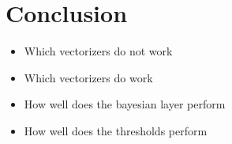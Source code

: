 \section{Conclusion}
\begin{itemize}
\item Which vectorizers do not work
\item Which vectorizers do work
\item How well does the bayesian layer perform
\item How well does the thresholds perform
\end{itemize}
